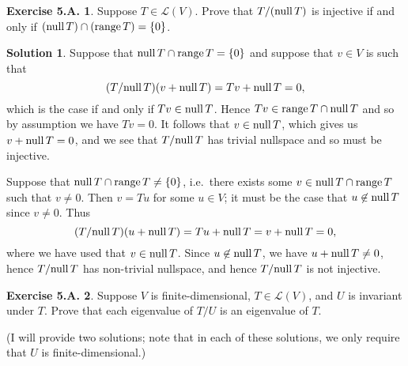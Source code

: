 \documentclass[12pt]{article}
\theoremstyle{definition}
\theoremstyle{exercise}
\newtheorem{exercise}{Exercise 5.A.}
\theoremstyle{solution}
\newtheorem*{solution}{Solution}
\newcommand{\lmap}{\mathcal{L}}
\newcommand{\Null}{\text{null\,}}
\newcommand{\Range}{\text{range\,}}
\begin{document}
\begin{exercise}
\label{ex:34}
    Suppose \( T \in \lmap(V) \). Prove that \( T/(\Null T) \) is injective if and only if \( (\Null T) \cap (\Range T) = \{ 0 \} \).
\end{exercise}

\begin{solution}
    Suppose that \( \Null T \cap \Range T = \{ 0 \} \) and suppose that \( v \in V \) is such that
    \[
        (T/\Null T)(v + \Null T) = Tv + \Null T = 0,
    \]
    which is the case if and only if \( Tv \in \Null T \). Hence \( Tv \in \Range T \cap \Null T \) and so by assumption we have \( Tv = 0 \). It follows that \( v \in \Null T \), which gives us \( v + \Null T = 0 \), and we see that \( T/\Null T \) has trivial nullspace and so must be injective.

    Suppose that \( \Null T \cap \Range T \neq \{ 0 \} \), i.e.\ there exists some \( v \in \Null T \cap \Range T \) such that \( v \neq 0 \). Then \( v = Tu \) for some \( u \in V \); it must be the case that \( u \not\in \Null T \) since \( v \neq 0 \). Thus
    \[
        (T/\Null T)(u + \Null T) = Tu + \Null T = v + \Null T = 0,
    \]
    where we have used that \( v \in \Null T \). Since \( u \not\in \Null T \), we have \( u + \Null T \neq 0 \), hence \( T/\Null T \) has non-trivial nullspace, and hence \( T/\Null T \) is not injective.
\end{solution}

\begin{exercise}
\label{ex:35}
    Suppose \( V \) is finite-dimensional, \( T \in \lmap(V) \), and \( U \) is invariant under \( T \). Prove that each eigenvalue of \( T/U \) is an eigenvalue of \( T \).

\end{exercise}

\noindent (I will provide two solutions; note that in each of these solutions, we only require that \( U \) is finite-dimensional.)
\end{document}
